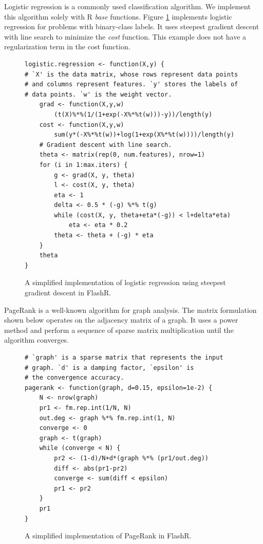 Logistic regression is a commonly used classification algorithm.
We implement this algorithm solely with R \textit{base} functions. Figure
\ref{logistic} implements logistic regression for problems with binary-class
labels. It uses steepest gradient descent with line search to minimize
the \textit{cost} function. This example does not have a regularization term
in the cost function.
\begin{figure}[H]
\begin{verbatim}
logistic.regression <- function(X,y) {
# `X' is the data matrix, whose rows represent data points
# and columns represent features. `y' stores the labels of
# data points. `w' is the weight vector.
	grad <- function(X,y,w)
		(t(X)%*%(1/(1+exp(-X%*%t(w)))-y))/length(y)
	cost <- function(X,y,w)
		sum(y*(-X%*%t(w))+log(1+exp(X%*%t(w))))/length(y)
	# Gradient descent with line search.
	theta <- matrix(rep(0, num.features), nrow=1)
	for (i in 1:max.iters) {
		g <- grad(X, y, theta)
		l <- cost(X, y, theta)
		eta <- 1
		delta <- 0.5 * (-g) %*% t(g)
		while (cost(X, y, theta+eta*(-g)) < l+delta*eta)
			eta <- eta * 0.2
		theta <- theta + (-g) * eta
	}
	theta
}
\end{verbatim}
\caption{A simplified implementation of logistic regression using
steepest gradient descent in FlashR.}
\label{logistic}
\end{figure}

PageRank is a well-known algorithm for graph analysis. The matrix formulation
shown below operates on the adjacency matrix of a graph. It uses a power
method and perform a sequence of sparse matrix multiplication until
the algorithm converges.
\begin{figure}[H]
\begin{verbatim}
# `graph' is a sparse matrix that represents the input
# graph. `d' is a damping factor, `epsilon' is
# the convergence accuracy.
pagerank <- function(graph, d=0.15, epsilon=1e-2) {
	N <- nrow(graph)
	pr1 <- fm.rep.int(1/N, N)
	out.deg <- graph %*% fm.rep.int(1, N)
	converge <- 0
	graph <- t(graph)
	while (converge < N) {
		pr2 <- (1-d)/N+d*(graph %*% (pr1/out.deg))
		diff <- abs(pr1-pr2)
		converge <- sum(diff < epsilon)
		pr1 <- pr2
	}
	pr1
}
\end{verbatim}
\caption{A simplified implementation of PageRank in FlashR.}
\end{figure}

